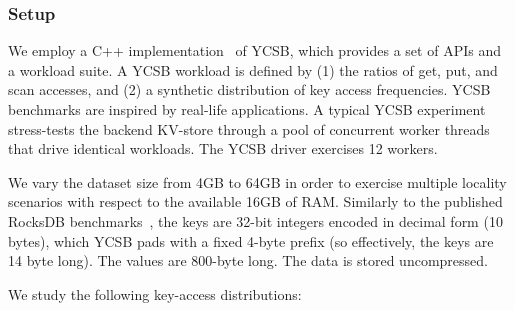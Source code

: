 \subsubsection{Setup}
\label{ssec:setup} 

We employ a C++ implementation~\cite{Cpp-YCSB} of YCSB, which
provides a set of APIs and a workload suite. 
A YCSB workload is defined by  (1) the ratios of get, put, and scan accesses, 
and (2) a synthetic distribution of key access frequencies. 
YCSB  benchmarks  are inspired by real-life applications.
A typical YCSB experiment stress-tests the backend KV-store through a pool of concurrent worker threads that drive identical
workloads. %
The YCSB driver  exercises 12 workers. 

We vary the dataset size from 4GB to 64GB in order to exercise multiple locality 
scenarios with respect to the available 16GB of RAM. Similarly to the published RocksDB benchmarks~\cite{RocksDBPerf}, 
the keys are 32-bit integers encoded in decimal form (10 bytes), which YCSB pads with a fixed 4-byte prefix (so effectively, 
the keys are 14 byte long). The values are 800-byte long. The data is stored uncompressed. 

We study the following key-access distributions:  

